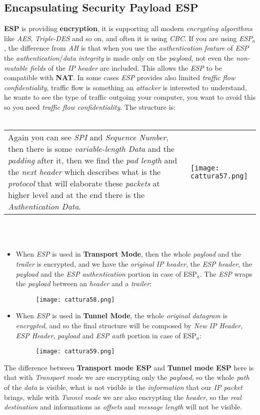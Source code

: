\documentclass{article}
\begin{document}
\subsection{Encapsulating Security Payload ESP}
\textbf{ESP} is providing \textbf{encryption}, it is supporting all modern \emph{encrypting algorithms} like \emph{AES}, \emph{Triple-DES} and so on, and often it is using \emph{CBC}. If you are using \emph{ESP}$_a$, the difference from \emph{AH} is that when you use the \emph{authentication} \emph{feature} of \emph{ESP} the \emph{authentication}/\emph{data integrity} is made only on the \emph{payload}, not even the \emph{non-mutable fields} of the \emph{IP header} are included. This allows the \emph{ESP} to be compatible with \textbf{NAT}. In some cases \emph{ESP} provides also limited \emph{traffic flow confidentiality}, traffic flow is something an \emph{attacker} is interested to understand, he wants to see the type of traffic outgoing your computer, you want to avoid this so you need \emph{traffic flow confidentiality}. The structure is:\\\\
\begin{tabular}{C{9cm}  L{10.5cm}}
Again you can see \emph{SPI} and \emph{Sequence Number}, then there is some \emph{variable-length Data} and the \emph{padding} after it, then we find the \emph{pad length} and the \emph{next header} which describes what is the \emph{protocol} that will elaborate these \emph{packets} at higher level and at the end there is the \emph{Authentication Data}. 
& \texttt{[image: cattura57.png]}
\end{tabular} \\\\
\begin{itemize}
\item When \emph{ESP} is used in \textbf{Transport Mode}, then the whole \emph{payload} and the \emph{trailer} is encrypted, and we have the \emph{original IP header}, the \emph{ESP header}, the \emph{payload} and the \emph{ESP authentication} portion in case of ESP$_a$. The \emph{ESP} wraps the \emph{payload} between an \emph{header} and a \emph{trailer}:
\begin{figure}[H]
  \centering
  \texttt{[image: cattura58.png]}
\end{figure}
\item When \emph{ESP} is used in \textbf{Tunnel Mode}, the whole \emph{original datagram} is \emph{encrypted}, and so the final structure will be composed by \emph{New IP Header}, \emph{ESP Header}, \emph{payload} and \emph{ESP auth} portion in case of ESP$_a$:
\begin{figure}[H]
  \centering
  \texttt{[image: cattura59.png]}
\end{figure}
\end{itemize}
The difference between \textbf{Transport mode ESP} and \textbf{Tunnel mode ESP} here is that with \emph{Transport mode} we are encrypting only the \emph{payload}, so the whole \emph{path} of the \emph{data} is visible, what is not visible is the \emph{information} that our \emph{IP packet} brings, while with \emph{Tunnel mode} we are also encrypting the \emph{header}, so the \emph{real destination} and informations as \emph{offsets} and \emph{message length} will not be visible. 
\end{document}
